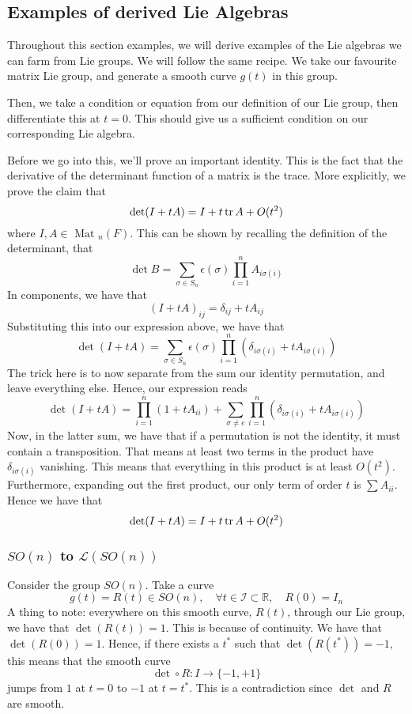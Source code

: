 \subsection{Examples of derived Lie Algebras}
Throughout this section examples, we will derive examples of 
the Lie algebras we can farm from Lie groups. 
We will follow the same recipe. We take our favourite 
matrix Lie group, and generate a smooth curve $ g ( t) $ 
in this group. 

Then, we take a condition or equation from our definition of 
our Lie group, then differentiate this at $ t = 0$. 
This should give us a sufficient condition on our corresponding 
Lie algebra.

Before we go into this, we'll prove an important identity. 
This is the fact that the derivative of the determinant 
function of a matrix is the trace.
More explicitly, we prove the claim that 
\[
 \det ( I + t A ) = I + t \tr A + O ( t^ 2 ) 
\] where $ I, A \in \text{ Mat } _ n  ( F) $.
This can be shown by recalling the definition of the determinant,
that 
\[
	\det B = \sum_{ \sigma \in S _ n } \epsilon ( \sigma ) \prod_{ i = 1 } ^ n A _{ i \sigma ( i ) }
\] In components, 
we have that 
\[
 ( I + t A)_{ ij } =  \delta_{ ij } + t A_{ ij }
\] Substituting this into our expression above, 
we have that 
\[
	\det ( I + tA )  = \sum_{ \sigma \in S_n } \epsilon ( \sigma) \prod_{ i =1 } ^ n ( \delta_{ i \sigma ( i ) } + t A_{ i \sigma ( i ) } ) 
\] The trick here is to now separate from the sum our 
identity permutation, and leave everything else. 
Hence, our expression reads 
\[
	\det ( I + t A )  = \prod_{ i = 1 } ^ n ( 1 + t A_{ ii } ) + \sum_{ \sigma \neq e } \prod_{ i = 1 } ^ n ( \delta_{ i \sigma ( i ) } + t A_{ i \sigma ( i ) } ) 
\] Now, in the latter sum, we have that 
if a permutation is not the identity, it must 
contain a transposition. That means at least two terms in the product 
have $ \delta_{ i \sigma ( i ) }  $ vanishing. This means that 
everything in this product is at least $ O ( t^ 2 ) $. 
Furthermore, expanding out the first product, our only term 
of order  $ t $ is $ \sum A_{ ii } $. Hence we have that 
\[
 \det ( I + t A ) = I + t \tr A + O ( t^ 2 )
\] 

\subsubsection{$ SO ( n ) $ to $ \mathcal{ L } ( SO ( n ) ) $} 
Consider the group $ SO ( n ) $. Take a curve 
\[
g ( t)  = R( t) \in SO ( n ), \quad \forall t \in \mathcal{ I } \subset \mathbb{ R}, \quad  R ( 0 ) = I_n
\] A thing to note: everywhere on this smooth curve, $R( t) $, through 
our Lie group, we have that $ \det (R( t) )  = 1$. This is because of continuity.
We have that  $ \det ( R ( 0 ) )  = 1$. Hence, if there
exists a  $ t^ * $ such that  $  \det ( R( t^ * ) ) = - 1$, this means that the 
smooth curve
 \[
 \det \circ R : I \rightarrow \{ -1 , + 1 \} 
\] jumps from $ 1 $ at $ t = 0  $  to $ -1 $ at $ t = t ^ * $. 
This is a contradiction since  $ \det  $ and $ R $ are smooth. 

